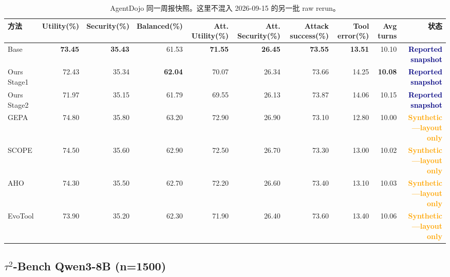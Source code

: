 \documentclass[a4paper,11pt]{article}
\newcommand{\reported}{\textcolor{navy}{\textbf{Reported snapshot}}}
\newcommand{\layoutonly}{\textcolor{orange}{\textbf{Synthetic---layout only}}}
\begin{document}
\begin{CJK*}{UTF8}{gbsn}
\begin{table}[H]
\centering\scriptsize
\caption{AgentDojo 同一周报快照。这里不混入 2026-09-15 的另一批 raw rerun。}
\begin{adjustbox}{max width=\textwidth}
\begin{tabular}{lrrrrrrrrr}
\toprule
方法 & Utility(\%) & Security(\%) & Balanced(\%) & Att. Utility(\%) & Att. Security(\%) & Attack success(\%) & Tool error(\%) & Avg turns & 状态\\
\midrule
Base & \textbf{73.45} & \textbf{35.43} & 61.53 & \textbf{71.55} & \textbf{26.45} & \textbf{73.55} & \textbf{13.51} & 10.10 & \reported\\
Ours Stage1 & 72.43 & 35.34 & \textbf{62.04} & 70.07 & 26.34 & 73.66 & 14.25 & \textbf{10.08} & \reported\\
Ours Stage2 & 71.97 & 35.15 & 61.79 & 69.55 & 26.13 & 73.87 & 14.06 & 10.15 & \reported\\
GEPA & 74.80 & 35.80 & 63.20 & 72.90 & 26.90 & 73.10 & 12.80 & 10.00 & \layoutonly\\
SCOPE & 74.50 & 35.60 & 62.90 & 72.50 & 26.70 & 73.30 & 13.00 & 10.02 & \layoutonly\\
AHO & 74.30 & 35.50 & 62.70 & 72.20 & 26.60 & 73.40 & 13.10 & 10.03 & \layoutonly\\
EvoTool & 73.90 & 35.20 & 62.30 & 71.90 & 26.40 & 73.60 & 13.40 & 10.06 & \layoutonly\\
\bottomrule
\end{tabular}
\end{adjustbox}
\end{table}

\iffalse
\subsection{\texorpdfstring{$\tau^2$-Bench Qwen3-8B (n=1500)}{tau2-Bench Qwen3-8B (n=1500)}}


\end{CJK*}
\end{document}
